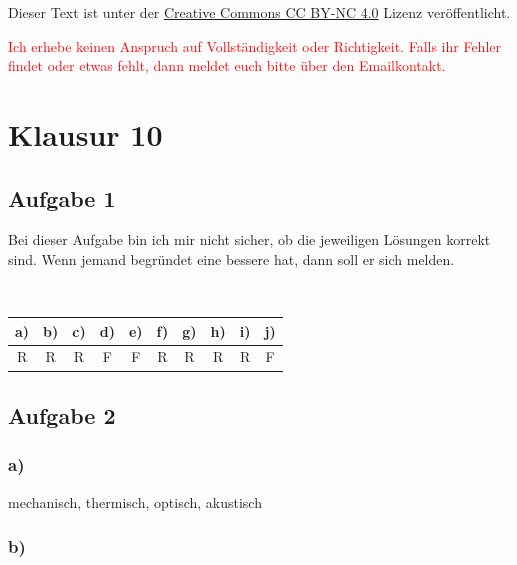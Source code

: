
\usepackage{paralist}


\maketitle

Dieser Text ist unter der
\href{http://creativecommons.org/licenses/by-nc/4.0/}{Creative Commons CC BY-NC 4.0}
Lizenz veröffentlicht.

\textcolor{red}{%
    Ich erhebe keinen Anspruch auf Vollständigkeit oder Richtigkeit. Falls ihr
    Fehler findet oder etwas fehlt, dann meldet euch bitte über den
    Emailkontakt.
}


\tableofcontents

\newpage


\section{Klausur 10}

\subsection{Aufgabe 1}

Bei dieser Aufgabe bin ich mir nicht sicher, ob die jeweiligen Lösungen korrekt sind. Wenn jemand begründet eine bessere hat, dann soll er sich melden.

\hfill\\

\begin{center}
\begin{tabular}{c|c|c|c|c|c|c|c|c|c}
a) & b) & c) & d) & e) & f) & g) & h) & i) & j) \\ 
\hline 
R & R & R & F & F & R & R & R & R & F \\ 
\end{tabular} 
\end{center}


\subsection{Aufgabe 2}

\subsubsection*{a)}

mechanisch, thermisch, optisch, akustisch

\subsubsection*{b)}

